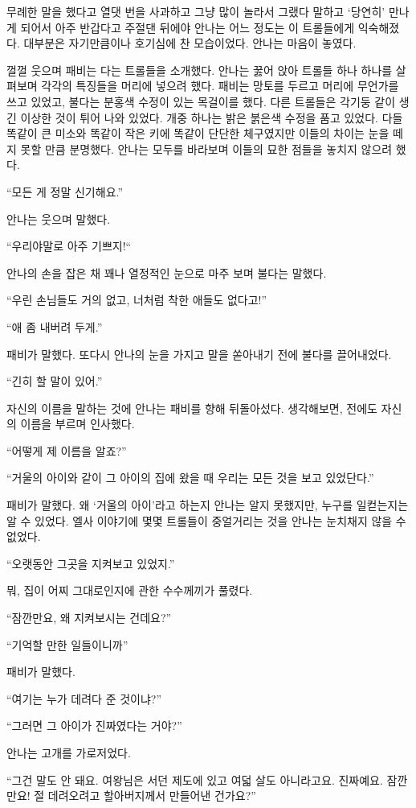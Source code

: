 무례한 말을 했다고 열댓 번을 사과하고 그냥 많이 놀라서 그랬다 말하고 `당연히' 만나게 되어서 아주 반갑다고 주절댄 뒤에야 안나는 어느 정도는 이 트롤들에게 익숙해졌다. 대부분은 자기만큼이나 호기심에 찬 모습이었다. 안나는 마음이 놓였다.

껄껄 웃으며 패비는 다는 트롤들을 소개했다. 안나는 꿇어 앉아 트롤들 하나 하나를 살펴보며 각각의 특징들을 머리에 넣으려 했다. 패비는 망토를 두르고 머리에 무언가를 쓰고 있었고, 불다는 분홍색 수정이 있는 목걸이를 했다. 다른 트롤들은 각기둥 같이 생긴 이상한 것이 튀어 나와 있었다. 개중 하나는 밝은 붉은색 수정을 품고 있었다. 다들 똑같이 큰 미소와 똑같이 작은 키에 똑같이 단단한 체구였지만 이들의 차이는 눈을 떼지 못할 만큼 분명했다. 안나는 모두를 바라보며 이들의 묘한 점들을 놓치지 않으려 했다.

``모든 게 정말 신기해요.''

안나는 웃으며 말했다.

``우리야말로 아주 기쁘지!``

안나의 손을 잡은 채 꽤나 열정적인 눈으로 마주 보며 불다는 말했다.

``우린 손님들도 거의 없고, 너처럼 착한 애들도 없다고!''

``애 좀 내버려 두게.''

패비가 말했다. 또다시 안나의 눈을 가지고 말을 쏟아내기 전에 불다를 끌어내었다.

``긴히 할 말이 있어.''

자신의 이름을 말하는 것에 안나는 패비를 향해 뒤돌아섰다. 생각해보면, 전에도 자신의 이름을 부르며 인사했다.

``어떻게 제 이름을 알죠?''

``거울의 아이와 같이 그 아이의 집에 왔을 때 우리는 모든 것을 보고 있었단다.''

패비가 말했다. 왜 `거울의 아이'라고 하는지 안나는 알지 못했지만, 누구를 일컫는지는 알 수 있었다. 엘사 이야기에 몇몇 트롤들이 중얼거리는 것을 안나는 눈치채지 않을 수 없었다.

``오랫동안 그곳을 지켜보고 있었지.''

뭐, 집이 어찌 그대로인지에 관한 수수께끼가 풀렸다.

``잠깐만요, 왜 지켜보시는 건데요?''

``기억할 만한 일들이니까''

패비가 말했다.

``여기는 누가 데려다 준 것이냐?''

``그러면 그 아이가 진짜였다는 거야?''

안나는 고개를 가로저었다.

``그건 말도 안 돼요. 여왕님은 서던 제도에 있고 여덟 살도 아니라고요. 진짜예요. 잠깐만요! 절 데려오려고 할아버지께서 만들어낸 건가요?''


